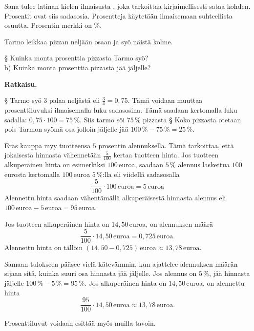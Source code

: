 Sana  tulee latinan kielen ilmaisusta ,
joka tarkoittaa kirjaimellisesti sataa kohden. 
Prosentit ovat siis sadasosia.
Prosentteja käytetään ilmaisemaan suhteellista osuutta.
Prosentin merkki on \%.


\begin{esimerkki}
Tarmo leikkaa pizzan neljään osaan ja syö näistä kolme.

§ Kuinka monta prosenttia pizzasta Tarmo syö? \\
b) Kuinka monta prosenttia pizzasta jää jäljelle?

\textbf{Ratkaisu.}

§ Tarmo syö 3 palaa neljästä eli $\frac{3}{4} = 0,75$. Tämä voidaan muuttaa prosenttiluvuksi ilmaisemalla luku sadasosina. Tämä saadaan kertomalla luku sadalla: $0,75 \cdot 100 = 75\,\%$. Siis tarmo söi $75\,\%$ pizzasta
\newline
§ Koko pizzasta otetaan pois Tarmon syömä osa jolloin jäljelle jää $100\,\% - 75\,\% = 25\,\%$.
\end{esimerkki}


\begin{esimerkki}
Eräs kauppa myy tuotteensa $5$ prosentin alennuksella. Tämä tarkoittaa, että jokaisesta hinnasta vähennetään $\frac{5}{100}$ kertaa tuotteen hinta. Jos tuotteen alkuperäinen hinta on esimerkiksi $100$\,euroa, saadaan $5\,\%$ alennus laskettua $100$\,eurosta kertomalla $100$\,euroa $5\,\%$:lla eli viidellä sadasosalla 
\[
\frac{5}{100} \cdot 100\,\text{euroa} = 5\,\text{euroa}
\]
Alennettu hinta saadaan vähentämällä alkuperäisestä hinnasta alennus eli $100\,\text{euroa} - 5\,\text{euroa} = 95\,\text{euroa}$.

Jos tuotteen alkuperäinen hinta on $14,50$\,euroa, on alennuksen määrä
\[
	\frac{5}{100} \cdot 14,50\,\text{euroa} = 0,725\,\text{euroa}.
\]
Alennettu hinta on tällöin $(14,50 - 0,725)\,\text{euroa} \approx 13,78\,\text{euroa}$.

Samaan tulokseen pääsee vielä kätevämmin, kun ajattelee alennuksen määrän sijaan sitä, kuinka suuri osa hinnasta jää jäljelle. Jos alennus on $5\,\%$, jää hinnasta jäljelle $100\,\% - 5\,\% = 95\,\%$. Jos alkuperäinen hinta on $14,50$\,euroa, on alennettu hinta 
\[
	\frac{95}{100} \cdot 14,50\,\text{euroa} \approx 13,78\,\text{euroa}.
\]
\end{esimerkki}

\begin{esimerkki}
    Prosenttiluvut voidaan esittää myös muilla tavoin.
\end{esimerkki}

